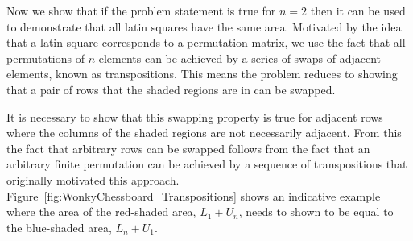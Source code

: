 Now we show that if the problem statement is true for $n = 2$ then it can be used to demonstrate that all latin squares have the same area. Motivated by the idea that a latin square corresponds to a permutation matrix, we use the fact that all permutations of $n$ elements can be achieved by a series of swaps of adjacent elements, known as transpositions. This means the problem reduces to showing that a pair of rows that the shaded regions are in can be swapped.

It is necessary to show that this swapping property is true for adjacent rows where the columns of the shaded regions are not necessarily adjacent. From this the fact that arbitrary rows can be swapped follows from the fact that an arbitrary finite permutation can be achieved by a sequence of transpositions that originally motivated this approach. Figure~\ref{fig:WonkyChessboard_Transpositions} shows an indicative example where the area of the red-shaded area, $L_1 + U_n$, needs to shown to be equal to the blue-shaded area, $L_n + U_1$.

